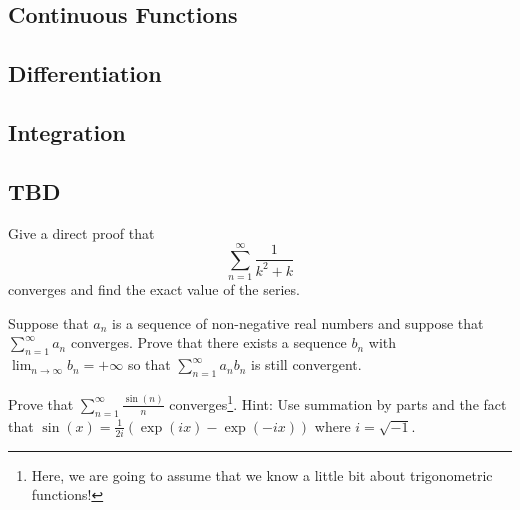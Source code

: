 \subsection{Continuous Functions}

\subsection{Differentiation}

\subsection{Integration}

\subsection{TBD} 

  \begin{exercise}
    Give a direct proof that
    \begin{equation}
      \sum_{n=1}^{\infty} \frac{1}{k^2+k}
    \end{equation}
    converges and find the exact value of the series.
  \end{exercise}
  \begin{solution}

  \end{solution}

  \begin{exercise}
    Suppose that $a_n$ is a sequence of non-negative real numbers and suppose that $\sum_{n=1}^{\infty} a_n$ converges. Prove that there exists a sequence $b_n$ with $\lim_{n \to \infty} b_n = +\infty$ so that $\sum_{n=1}^{\infty} a_n b_n$ is still convergent.
  \end{exercise}
  \begin{solution}

  \end{solution}

  \begin{exercise}
    Prove that $\sum_{n=1}^{\infty} \frac{\sin(n)}{n}$ converges\footnote{Here, we are going to assume that we know a little bit about trigonometric functions!}. Hint: Use summation by parts and the fact that $\sin(x) = \frac{1}{2i}(\exp(ix) - \exp(-ix))$ where $i = \sqrt{-1}$.
  \end{exercise}
  \begin{solution}

  \end{solution}

